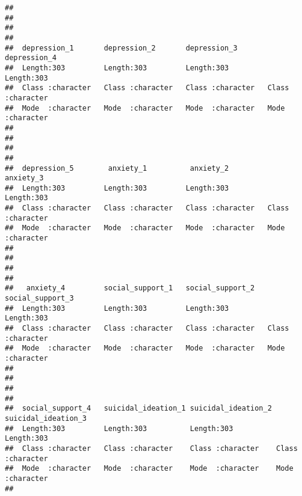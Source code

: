 \documentclass[
]{article}
\begin{document}
\begin{verbatim}
##                                                                             
##                                                                             
##                                                                             
##                                                                             
##  depression_1       depression_2       depression_3       depression_4      
##  Length:303         Length:303         Length:303         Length:303        
##  Class :character   Class :character   Class :character   Class :character  
##  Mode  :character   Mode  :character   Mode  :character   Mode  :character  
##                                                                             
##                                                                             
##                                                                             
##                                                                             
##  depression_5        anxiety_1          anxiety_2          anxiety_3        
##  Length:303         Length:303         Length:303         Length:303        
##  Class :character   Class :character   Class :character   Class :character  
##  Mode  :character   Mode  :character   Mode  :character   Mode  :character  
##                                                                             
##                                                                             
##                                                                             
##                                                                             
##   anxiety_4         social_support_1   social_support_2   social_support_3  
##  Length:303         Length:303         Length:303         Length:303        
##  Class :character   Class :character   Class :character   Class :character  
##  Mode  :character   Mode  :character   Mode  :character   Mode  :character  
##                                                                             
##                                                                             
##                                                                             
##                                                                             
##  social_support_4   suicidal_ideation_1 suicidal_ideation_2 suicidal_ideation_3
##  Length:303         Length:303          Length:303          Length:303         
##  Class :character   Class :character    Class :character    Class :character   
##  Mode  :character   Mode  :character    Mode  :character    Mode  :character   
##                                                                                

\end{verbatim}
\end{document}
